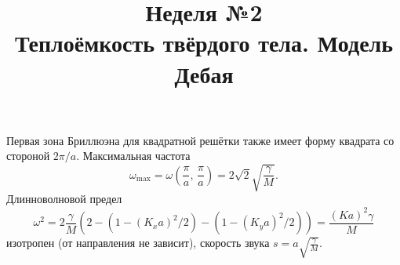 \documentclass[a4paper]{article}
\title{Неделя №2\\
Теплоёмкость твёрдого тела.
Модель Дебая}
\begin{document}
	\maketitle
\begin{hiProb}[2.27]	
\end{hiProb}
\begin{sol}
\end{sol}
Первая зона Бриллюэна для квадратной решётки также
имеет форму квадрата со стороной $2\pi /a$. Максимальная частота
\[
	\omega_{\max}=\omega\left( \frac{\pi}{a},\,
	\frac{\pi}{a}\right) = 2\sqrt{2} 
	\sqrt{\frac{\gamma}{M}} 
.\] 
Длинноволновой предел
\[
	\omega^2= 2 \frac{\gamma}{M} \left( 
	2- \left( 1- \left( K_x a \right) ^2 /2 \right) - \left( 1-\left( K_y a \right) ^2 /2\right) \right) 
	=\frac{\left( Ka \right) ^2 \gamma}{M}
\] 
изотропен (от направления не зависит), скорость
звука $\displaystyle  s= a \sqrt{\frac{\gamma}{M}} $.
\end{document}
